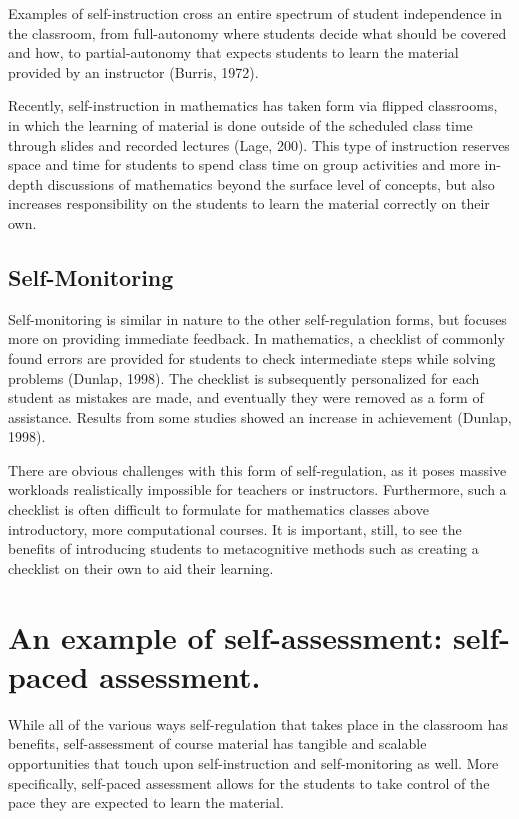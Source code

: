 Examples of self-instruction cross an entire spectrum of student independence in the classroom, from full-autonomy where students decide what should be covered and how, to partial-autonomy that expects students to learn the material provided by an instructor (Burris, 1972).

Recently, self-instruction in mathematics has taken form via flipped classrooms, in which the learning of material is done outside of the scheduled class time through slides and recorded lectures (Lage, 200). This type of instruction reserves space and time for students to spend class time on group activities and more in-depth discussions of mathematics beyond the surface level of concepts, but also increases responsibility on the students to learn the material correctly on their own.

\subsection{Self-Monitoring}
Self-monitoring is similar in nature to the other self-regulation forms, but focuses more on providing immediate feedback. In mathematics, a checklist of commonly found errors are provided for students to check intermediate steps while solving problems (Dunlap, 1998). The checklist is subsequently personalized for each student as mistakes are made, and eventually they were removed as a form of assistance. Results from some studies showed an increase in achievement (Dunlap, 1998).

There are obvious challenges with this form of self-regulation, as it  poses massive workloads realistically impossible for teachers or instructors. Furthermore, such a checklist is often difficult to formulate for mathematics classes above introductory, more computational courses. It is important, still, to see the benefits of introducing students to metacognitive methods such as creating a checklist on their own to aid their learning.

\section{An example of self-assessment: self-paced assessment.}
While all of the various ways self-regulation that takes place in the classroom has benefits, self-assessment of course material has tangible and scalable opportunities that touch upon self-instruction and self-monitoring as well. More specifically, self-paced assessment allows for the students to take control of the pace they are expected to learn the material.

